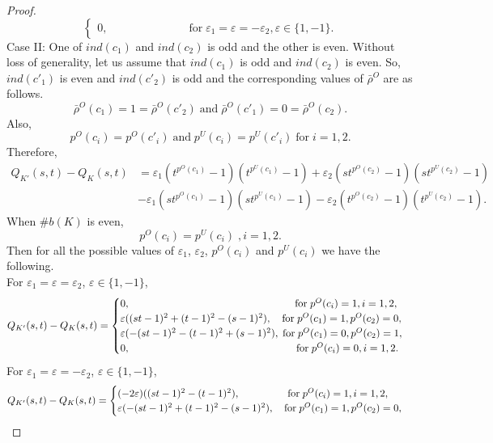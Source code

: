 \documentclass[10pt,a4paper,reqno]{amsart}
\theoremstyle{definition}
\theoremstyle{remark}
\begin{document}
\begin{proof}
$$\begin{cases}
			0,  \hspace{3cm} \text{for} \; \varepsilon_{1}=\varepsilon=-\varepsilon_{2},   \varepsilon \in \{1,-1\}.
		\end{cases}	$$
\noindent
	Case II:  One of $ind(c_{1})$ and $ind(c_{2})$ is odd and the other is even. Without loss of generality, let us assume that $ind(c_{1})$ is odd and $ind(c_{2})$ is even.
		So, $ind(c'_{1})$ is even and $ind(c'_{2})$ is odd and the corresponding values of $\bar{\rho}^{O}$ are as follows.
		\[\bar{\rho}^{O}(c_{1})=1=\bar{\rho}^{O}(c'_{2}) \; \text{and} \; \bar{\rho}^{O}(c'_{1})=0=\bar{\rho}^{O}(c_{2}). \]
		Also, \[p^{O}(c_{i})=p^{O}(c'_{i})  \; \text{and} \; p^{U}(c_{i})=p^{U}(c'_{i}) \; \text{for} \; i=1,2.\]
		Therefore, \begin{align*}
			Q_{K'}(s,t)-Q_{K}(s,t) &=\varepsilon_{1}(t^{p^{O}(c_{1})}-1)(t^{p^{U}(c_{1})}-1)+\varepsilon_{2}(st^{p^{O}(c_{2})}-1)(st^{p^{U}(c_{2})}-1)\\ &-\varepsilon_{1}(st^{p^{O}(c_{1})}-1)(st^{p^{U}(c_{1})}-1)-\varepsilon_{2}(t^{p^{O}(c_{2})}-1)(t^{p^{U}(c_{2})}-1).
		\end{align*}
		When $\# b(K)$ is even,\[p^{O}(c_i)=p^{U}(c_i)\; , i=1,2.\]
		Then for all the possible values of  $\varepsilon_{1}$, $\varepsilon_{2}$, $p^{O}(c_i)$ and  $p^{U}(c_i)$ we have the following.\\
		For $\varepsilon_{1}=\varepsilon=\varepsilon_{2}$,  $\varepsilon \in \{1,-1\}$,  \\
		$$Q_{K'}(s,t)-Q_{K}(s,t)
		=\begin{cases}
			0, \hspace{5.6cm} \text{for} \; p^{O}(c_i)=1
			, i=1,2,\\
			\varepsilon((st-1)^{2}+(t-1)^{2}-(s-1)^{2}), \quad \text{for} \; p^{O}(c_1)=1, p^{O}(c_2)=0,\\
			\varepsilon(-(st-1)^{2}-(t-1)^{2}+(s-1)^{2}),\; \text{for} \; p^{O}(c_1)=0, p^{O}(c_2)=1,\\
			0, \hspace{5.65cm} \text{for} \; p^{O}(c_i)=0, i=1,2.
		\end{cases}
		$$
		For $\varepsilon_{1}=\varepsilon=-\varepsilon_{2}$, $\varepsilon \in \{1,-1\}$,  
		$$Q_{K'}(s,t)-Q_{K}(s,t)
		=\begin{cases}
			(-2\varepsilon)((st-1)^{2}-(t-1)^{2}), \hspace{1.65cm} \text{for} \; p^{O}(c_i)=1
			, i=1,2,\\
			\varepsilon(-(st-1)^{2}+(t-1)^{2}-(s-1)^{2}), \quad \text{for} \; p^{O}(c_1)=1, p^{O}(c_2)=0,\\

\end{cases}$$
\end{proof}
\end{document}
